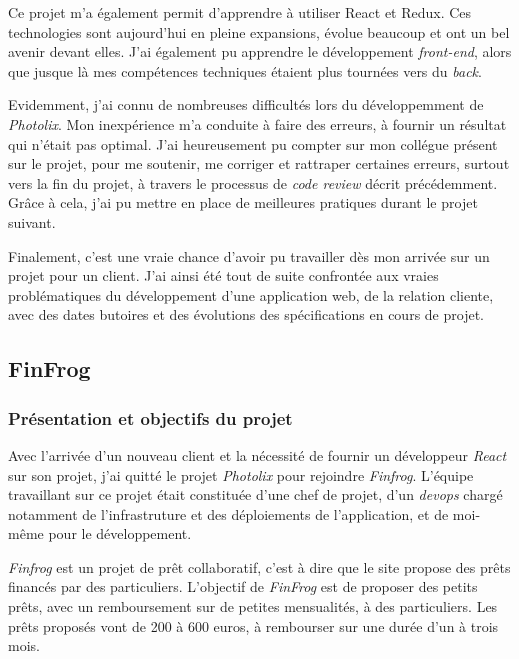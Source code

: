 \bigskip

Ce projet m'a également permit d'apprendre à utiliser React et Redux.
Ces technologies sont aujourd'hui en pleine expansions, évolue beaucoup
et ont un bel avenir devant elles. J'ai également pu apprendre le
développement \emph{front-end}, alors que jusque là mes compétences
techniques étaient plus tournées vers du \emph{back}.

\bigskip

Evidemment, j'ai connu de nombreuses difficultés lors du développemment
de \emph{Photolix}. Mon inexpérience m'a conduite à faire des erreurs, à
fournir un résultat qui n'était pas optimal. J'ai heureusement pu
compter sur mon collégue présent sur le projet, pour me soutenir, me
corriger et rattraper certaines erreurs, surtout vers la fin du projet,
à travers le processus de \emph{code review} décrit précédemment. Grâce
à cela, j'ai pu mettre en place de meilleures pratiques durant le projet
suivant.

\bigskip

Finalement, c'est une vraie chance d'avoir pu travailler dès mon arrivée
sur un projet pour un client. J'ai ainsi été tout de suite confrontée
aux vraies problématiques du développement d'une application web, de la
relation cliente, avec des dates butoires et des évolutions des
spécifications en cours de projet.

\subsection{FinFrog}\label{finfrog}

\subsubsection{Présentation et objectifs du
projet}\label{pruxe9sentation-et-objectifs-du-projet-1}

\bigskip

Avec l'arrivée d'un nouveau client et la nécessité de fournir un
développeur \emph{React} sur son projet, j'ai quitté le projet
\emph{Photolix} pour rejoindre \emph{Finfrog}. L'équipe travaillant sur
ce projet était constituée d'une chef de projet, d'un \emph{devops}
chargé notamment de l'infrastruture et des déploiements de
l'application, et de moi-même pour le développement.

\bigskip

\emph{Finfrog} est un projet de prêt collaboratif, c'est à dire que le
site propose des prêts financés par des particuliers. L'objectif de
\emph{FinFrog} est de proposer des petits prêts, avec un remboursement
sur de petites mensualités, à des particuliers. Les prêts proposés vont
de 200 à 600 euros, à rembourser sur une durée d'un à trois mois.

